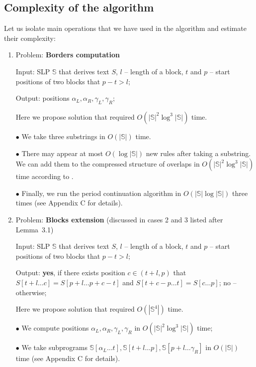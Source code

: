 \documentclass[11pt]{article}
\begin{document}
\subsection{Complexity of the algorithm}

Let us isolate main operations that we have used in the algorithm and estimate their complexity:

\begin{enumerate}
\item

{\sc Problem:} {\bf Borders computation}

{\sc Input:} SLP $\mathbb{S}$ that derives text $S$, $l$ -- length of a block, $t$ and $p$ -- start positions of
two blocks that $p - t > l$;

{\sc Output:} positions $\alpha_L, \alpha_R, \gamma_L, \gamma_R$;

Here we propose solution that required $O(|\mathbb{S}|^2\log^3|\mathbb{S}|)$ time.

$\bullet$ We take three substrings in $O(|\mathbb{S}|)$ time.

$\bullet$ There may appear at most $O(\log|\mathbb{S}|)$ new rules after taking a substring. We can add them to
the compressed structure of overlaps in $O(|\mathbb{S}|^2\log^3|\mathbb{S}|)$ time according to \cite{9}.

$\bullet$ Finally, we run the period continuation algorithm in $O(|\mathbb{S}|\log|\mathbb{S}|)$ three times (see
Appendix C for details).

\item
{\sc Problem:} {\bf Blocks extension} (discussed in cases 2 and 3 listed after Lemma~3.1)

{\sc Input:} SLP $\mathbb{S}$ that derives text $S$, $l$ -- length of a block, $t$ and $p$ -- start positions of
two blocks that $p - t > l$;

{\sc Output:} {\bf yes}, if there exists position $c \in (t + l, p)$ that $S[t + l\dots c] = S[p + l\dots p + c -
t]$ and $S[t + c - p\dots t] = S[c\dots p]$; no -- otherwise;

Here we propose solution that required $O(|\mathbb{S}^4|)$ time.

$\bullet$ We compute positions $\alpha_L, \alpha_R, \gamma_L, \gamma_R$ in $O(|\mathbb{S}|^2\log^3|\mathbb{S}|)$
time;

$\bullet$ We take subprograms $\mathbb{S}[\alpha_L\dots t], \mathbb{S}[t + l \dots p], \mathbb{S}[p + l\dots
\gamma_R]$ in $O(|\mathbb{S}|)$ time (see Appendix C for details).


\end{enumerate}
\end{document}
